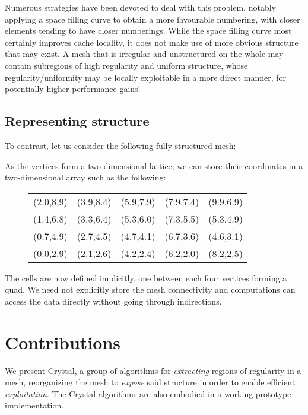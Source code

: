 Numerous strategies have been devoted to deal with this problem, notably applying a space filling curve to obtain a more favourable numbering, with closer elements tending to have closer numberings. While the space filling curve most certainly improves cache locality, it does not make use of more obvious structure that may exist. A mesh that is irregular and unstructured on the whole may contain subregions of high regularity and uniform structure, whose regularity/uniformity may be locally exploitable in a more direct manner, for potentially higher performance gains!


\subsection{Representing structure}
To contrast, let us consider the following fully structured mesh:
\begin{figure}[H]
\centering

\end{figure}

As the vertices form a two-dimensional lattice, we can store their coordinates in a two-dimensional array such as the following:
\begin{figure}[H]
\centering
\begin{tabular}{|c|c|c|c|c|}
(2.0,8.9) & (3.9,8.4) & (5.9,7.9) & (7.9,7.4) & (9.9,6.9) \\
(1.4,6.8) & (3.3,6.4) & (5.3,6.0) & (7.3,5.5) & (5.3,4.9) \\
(0.7,4.9) & (2.7,4.5) & (4.7,4.1) & (6.7,3.6) & (4.6,3.1) \\
(0.0,2.9) & (2.1,2.6) & (4.2,2.4) & (6.2,2.0) & (8.2,2.5) \\
\end{tabular}
\end{figure}

The cells are now defined implicitly, one between each four vertices forming a quad. We need not explicitly store the mesh connectivity and computations can access the data directly without going through indirections.



\section{Contributions}

We present Crystal, a group of algorithms for \emph{extracting} regions of regularity in a mesh, reorganizing the mesh to \emph{expose} said structure in order to enable efficient \emph{exploitation}. The Crystal algorithms are also embodied in a working prototype implementation.

